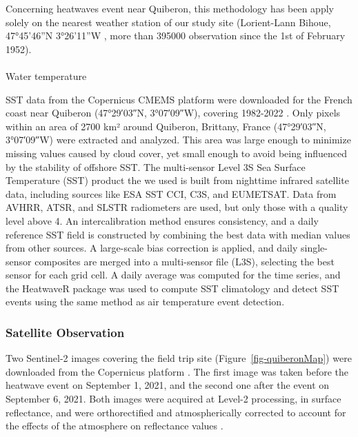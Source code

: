 \documentclass[
  number]{elsarticle}
\makeatletter
\let\oldparagraph\paragraph
\renewcommand{\paragraph}{
    \@ifstar
      \xxxParagraphStar
      \xxxParagraphNoStar
  }
\newcommand{\xxxParagraphStar}[1]{\oldparagraph*{#1}\mbox{}}
\newcommand{\xxxParagraphNoStar}[1]{\oldparagraph{#1}\mbox{}}
\makeatother
\begin{document}
Concerning heatwaves event near Quiberon, this methodology has been
apply solely on the nearest weather station of our study site
(Lorient-Lann Bihoue, 47°45'46''N 3°26'11''W , more than 395000
observation since the 1st of February 1952).

\paragraph{Water temperature}\label{water-temperature}

SST data from the Copernicus CMEMS platform were downloaded for the
French coast near Quiberon (47°29′03″N, 3°07′09″W), covering 1982-2022
\citep{CMEMS_1}. Only pixels within an area of 2700 km² around Quiberon,
Brittany, France (47°29′03″N, 3°07′09″W) were extracted and analyzed.
This area was large enough to minimize missing values caused by cloud
cover, yet small enough to avoid being influenced by the stability of
offshore SST. The multi-sensor Level 3S Sea Surface Temperature (SST)
product the we used is built from nighttime infrared satellite data,
including sources like ESA SST CCI, C3S, and EUMETSAT. Data from AVHRR,
ATSR, and SLSTR radiometers are used, but only those with a quality
level above 4. An intercalibration method ensures consistency, and a
daily reference SST field is constructed by combining the best data with
median values from other sources. A large-scale bias correction is
applied, and daily single-sensor composites are merged into a
multi-sensor file (L3S), selecting the best sensor for each grid cell. A
daily average was computed for the time series, and the HeatwaveR
package \citep{heatwaveR} was used to compute SST climatology and detect
SST events using the same method as air temperature event detection.

\subsubsection{Satellite Observation}\label{satellite-observation}

Two Sentinel-2 images covering the field trip site
(Figure~\ref{fig-quiberonMap}) were downloaded from the Copernicus
platform \citep{copernicus_sentinel2}. The first image was taken before
the heatwave event on September 1, 2021, and the second one after the
event on September 6, 2021. Both images were acquired at Level-2
processing, in surface reflectance, and were orthorectified and
atmospherically corrected to account for the effects of the atmosphere
on reflectance values \citep{sen2cor}.
\end{document}
